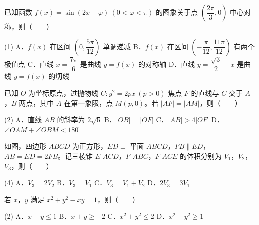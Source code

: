 \begin{question}
已知函数 $f(x)=\sin(2x+\varphi)\ (0<\varphi<\pi)$ 的图象关于点 $\left(\dfrac{2\pi}3,0\right)$ 中心对称，则（　　）

\begin{gkopts}(1)
\task A．$f(x)$ 在区间 $\left(0,\dfrac{5\pi}{12}\right)$ 单调递减
\task B．$f(x)$ 在区间 $\left(-\dfrac\pi{12},\dfrac{11\pi}{12}\right)$ 有两个极值点
\task C．直线 $x=\dfrac{7\pi}6$ 是曲线 $y=f(x)$ 的对称轴
\task D．直线 $y=\dfrac{\sqrt3}2-x$ 是曲线 $y=f(x)$ 的切线
\end{gkopts}

\end{question}
\begin{question}
已知 $O$ 为坐标原点，过抛物线 $C:y^{2}=2px\ (p>0)$ 焦点 $F$ 的直线与 $C$ 交于 $A$，$B$ 两点，其中 $A$ 在第一象限，点 $M(p,0)$。若 $|AF|=|AM|$，则（　　）

\begin{gkopts}(2)
\task A．直线 $AB$ 的斜率为 $2\sqrt6$
\task B．$|OB|=|OF|$
\task C．$|AB|>4|OF|$
\task D．$\angle OAM+\angle OBM<180^\circ$
\end{gkopts}

\Needspace{0.4\textheight}
\end{question}
\begin{question}
如图，四边形 $ABCD$ 为正方形，$ED\perp$ 平面 $ABCD$，$FB\parallel ED$，$AB=ED=2FB$。记三棱锥 $E\text{-}ACD$，$F\text{-}ABC$，$F\text{-}ACE$ 的体积分别为 $V_1$，$V_2$，$V_3$，则（　　）
\nopagebreak[4]
\begin{center}\end{center}
\nopagebreak[4]
\begin{gkopts}(4)
\task A．$V_3=2V_2$
\task B．$V_3=V_1$
\task C．$V_3=V_1+V_2$
\task D．$2V_3=3V_1$
\end{gkopts}

\end{question}
\begin{question}
若 $x$，$y$ 满足 $x^{2}+y^{2}-xy=1$，则（　　）

\begin{gkopts}(2)
\task A．$x+y\le1$
\task B．$x+y\ge-2$
\task C．$x^{2}+y^{2}\le2$
\task D．$x^{2}+y^{2}\ge1$
\end{gkopts}

\par\medskip

\end{question}

